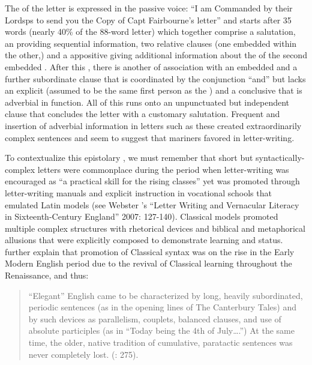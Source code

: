 The  of the letter is expressed in the passive voice: “I am Commanded by their Lordsps to send you the Copy of Capt Fairbourne’s letter” and starts after 35 words (nearly 40\% of the 88-word letter) which together comprise a  salutation, an  providing sequential information, two relative clauses (one embedded within the other,) and a  appositive giving additional information about the  of the second embedded . After this , there is another  of association with an embedded  and a further subordinate clause that is coordinated by the conjunction “and” but lacks an explicit  (assumed to be the same first person as the ) and a conclusive  that is adverbial in function. All of this runs onto an unpunctuated but independent clause that concludes the letter with a customary salutation. Frequent  and insertion of adverbial information in letters such as these created extraordinarily complex sentences and seem to suggest that mariners favored  in letter-writing.  

To contextualize this epistolary , we must remember that short but syntactically-complex letters were commonplace during the period when letter-writing was encouraged as “a practical skill for the rising classes” \citep[178,]{Mitchell2007} yet was promoted through letter-writing manuals and explicit instruction in vocational schools that emulated Latin models (see Webster \citeauthor{WebsterNewbold2007}’s “Letter Writing and Vernacular Literacy in Sixteenth-Century England” 2007: 127-140). Classical models promoted multiple complex structures with rhetorical devices and biblical and metaphorical allusions that were explicitly composed to demonstrate learning and status. \citet{MillwardHayes2012} further explain that promotion of Classical syntax was on the rise in the Early Modern English period due to the revival of Classical learning throughout the Renaissance, and thus:

\begin{quotation}
“Elegant” English came to be characterized by long, heavily subordinated, periodic sentences (as in the opening lines of The Canterbury Tales) and by such devices as parallelism, couplets, balanced clauses, and use of absolute participles (as in “Today being the 4th of July….”) At the same time, the older, native tradition of cumulative, paratactic sentences was never completely lost. (\citealt{MillwardHayes2012}: 275).
\end{quotation}

